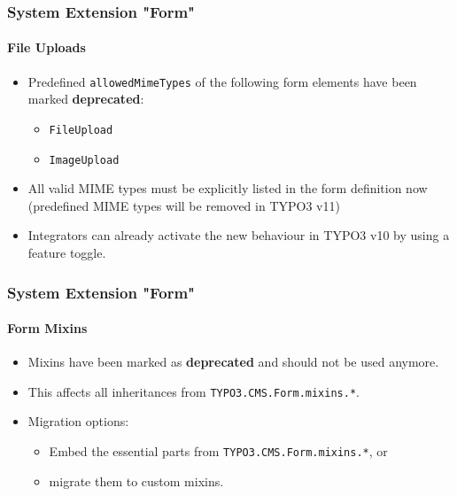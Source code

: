 
\begin{frame}[fragile]
	\frametitle{System Extension "Form"}
	\framesubtitle{File Uploads}

	\begin{itemize}
		\item Predefined \texttt{allowedMimeTypes} of the following form elements have been marked \textbf{deprecated}:

			\begin{itemize}
				\item \texttt{FileUpload}
				\item \texttt{ImageUpload}
			\end{itemize}

		\item All valid MIME types must be explicitly listed in the form definition now\newline
			\smaller
				(predefined MIME types will be removed in TYPO3 v11)
			\normalsize

		\item Integrators can already activate the new behaviour in TYPO3 v10 by using a feature toggle.

	\end{itemize}

\end{frame}


\begin{frame}[fragile]
	\frametitle{System Extension "Form"}
	\framesubtitle{Form Mixins}

	\begin{itemize}
		\item Mixins have been marked as \textbf{deprecated} and should not be used anymore.
		\item This affects all inheritances from \texttt{TYPO3.CMS.Form.mixins.*}.
		\item Migration options:

			\begin{itemize}
				\item Embed the essential parts from \texttt{TYPO3.CMS.Form.mixins.*}, or
				\item migrate them to custom mixins.
			\end{itemize}

	\end{itemize}

\end{frame}

